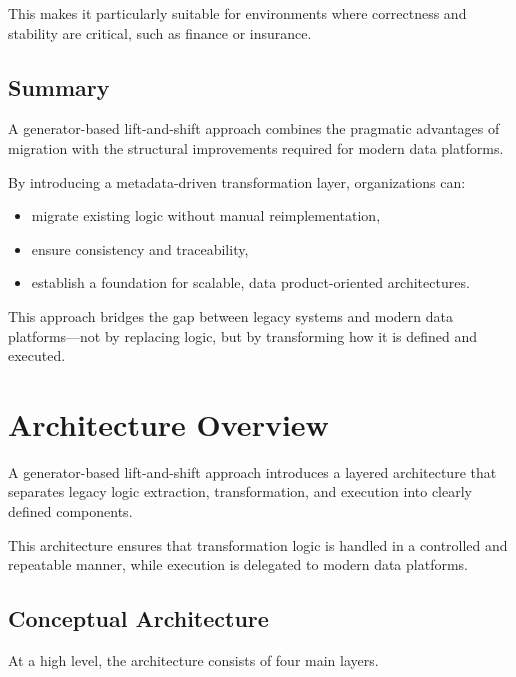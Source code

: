 \documentclass[11pt,a4paper]{article}
\begin{document}
This makes it particularly suitable for environments where correctness and stability are critical, such as finance or insurance.

\subsection{Summary}

A generator-based lift-and-shift approach combines the pragmatic advantages of migration with the structural improvements required for modern data platforms.

By introducing a metadata-driven transformation layer, organizations can:
\begin{itemize}
  \item migrate existing logic without manual reimplementation,
  \item ensure consistency and traceability,
  \item establish a foundation for scalable, data product-oriented architectures.
\end{itemize}

This approach bridges the gap between legacy systems and modern data platforms—not by replacing logic, but by transforming how it is defined and executed.

\section{Architecture Overview}

A generator-based lift-and-shift approach introduces a layered architecture that separates legacy logic extraction, transformation, and execution into clearly defined components.

This architecture ensures that transformation logic is handled in a controlled and repeatable manner, while execution is delegated to modern data platforms.

\subsection{Conceptual Architecture}

At a high level, the architecture consists of four main layers.
\end{document}
